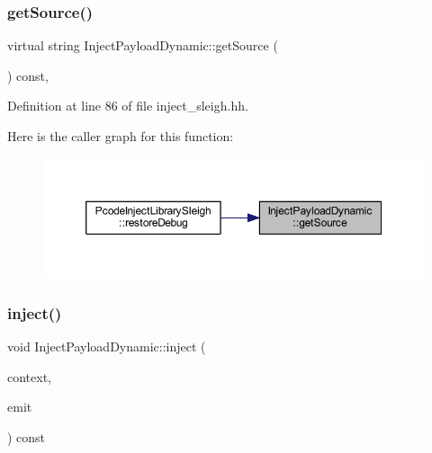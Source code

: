 \subsubsection{\texorpdfstring{getSource()}{getSource()}}
{\footnotesize\ttfamily virtual string Inject\+Payload\+Dynamic\+::get\+Source (\begin{DoxyParamCaption}\item[{void}]{ }\end{DoxyParamCaption}) const\hspace{0.3cm}{\ttfamily [inline]}, {\ttfamily [virtual]}}



Definition at line 86 of file inject\+\_\+sleigh.\+hh.

Here is the caller graph for this function\+:
\nopagebreak
\begin{figure}[H]
\begin{center}
\leavevmode
\includegraphics[width=350pt]{class_inject_payload_dynamic_a8c3b9e0779ebc8369ad309d2299b46b6_icgraph}
\end{center}
\end{figure}
\mbox{\label{class_inject_payload_dynamic_a3016f641e5901ad165b08969ac33730f}} 
\subsubsection{\texorpdfstring{inject()}{inject()}}
{\footnotesize\ttfamily void Inject\+Payload\+Dynamic\+::inject (\begin{DoxyParamCaption}\item[{\mbox{\hyperlink{class_inject_context}{Inject\+Context}} \&}]{context,  }\item[{\mbox{\hyperlink{class_pcode_emit}{Pcode\+Emit}} \&}]{emit }\end{DoxyParamCaption}) const\hspace{0.3cm}{\ttfamily [virtual]}}



